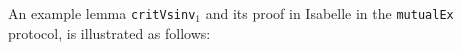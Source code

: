 \documentclass[final]{IEEEtran}
\begin{document}


 An  example lemma
{\tt critVsinv$_1$} and its proof in Isabelle in the {\tt mutualEx} protocol, is illustrated as follows:
\end{document}
